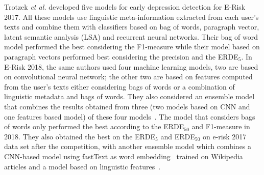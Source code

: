 \documentclass[graybox]{svmult}
\newcommand{\fr}[1]{\textcolor{brown}{#1}}
\begin{document}
Trotzek \textit{et al.} developed five models for early depression detection for E-Risk 2017. All these models use linguistic meta-information extracted from each user's texts and combine them with classifiers based on bag of words, paragraph vector, latent semantic analysis (LSA) and recurrent neural networks. Their bag of word model performed the best considering the F1-measure while their model based on  paragraph vectors performed best considering the precision and the ERDE$_{5}$. In E-Risk 2018, the same authors  used four machine learning models, two are based on convolutional neural network; the other two are based on features computed from the user's texts either considering bags of words or a combination of linguistic metadata and bags of words. They also considered an ensemble model that combines the results obtained from three (two models based on CNN and one features based model) of these four models~\cite{TrotzekKF18}. The
model that considers bags of words only performed the best  according to the ERDE$_{50}$ and F1-measure in 2018. They also obtained the best on the ERDE$_{5}$ and ERDE$_{50}$ on e-risk 2017 data set after the competition, %
 with another ensemble model which combines a CNN-based model using fastText as word embedding~\cite{GraveMJB17}  trained on Wikipedia articles and a model based on linguistic features~\cite{TrotzekKF20}. %
\end{document}
